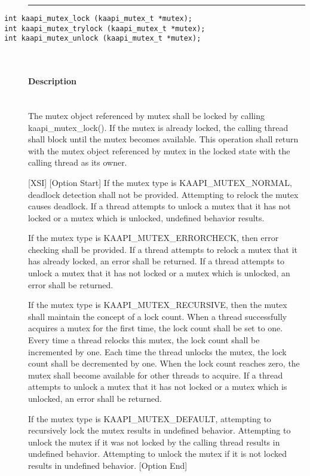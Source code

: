 \begin{description}
\vspace*{3ex} \hrule width 4cm
\vspace*{3ex} 
\item [\texttt{int kaapi\_mutex\_lock (kaapi\_mutex\_t *mutex);}]
\item [\texttt{int kaapi\_mutex\_trylock (kaapi\_mutex\_t *mutex);}]
\item [\texttt{int kaapi\_mutex\_unlock (kaapi\_mutex\_t *mutex);}]~\\

\paragraph{Description}~\\
The mutex object referenced by mutex shall be locked by calling
kaapi\_mutex\_lock(). If the mutex is already locked, the calling thread shall
block until the mutex becomes available. This operation shall return with the
mutex object referenced by mutex in the locked state with the calling thread
as its owner.

[XSI] [Option Start] If the mutex type is KAAPI\_MUTEX\_NORMAL, deadlock
detection shall not be provided. Attempting to relock the mutex causes
deadlock. If a thread attempts to unlock a mutex that it has not locked or a
mutex which is unlocked, undefined behavior results.

If the mutex type is KAAPI\_MUTEX\_ERRORCHECK, then error checking shall be
provided. If a thread attempts to relock a mutex that it has already locked,
an error shall be returned. If a thread attempts to unlock a mutex that it has
not locked or a mutex which is unlocked, an error shall be returned.

If the mutex type is KAAPI\_MUTEX\_RECURSIVE, then the mutex shall maintain
the concept of a lock count. When a thread successfully acquires a mutex for
the first time, the lock count shall be set to one. Every time a thread
relocks this mutex, the lock count shall be incremented by one. Each time the
thread unlocks the mutex, the lock count shall be decremented by one. When the
lock count reaches zero, the mutex shall become available for other threads to
acquire. If a thread attempts to unlock a mutex that it has not locked or a
mutex which is unlocked, an error shall be returned.

If the mutex type is KAAPI\_MUTEX\_DEFAULT, attempting to recursively lock the
mutex results in undefined behavior. Attempting to unlock the mutex if it was
not locked by the calling thread results in undefined behavior. Attempting to
unlock the mutex if it is not locked results in undefined behavior. [Option
  End]


\end{description}
